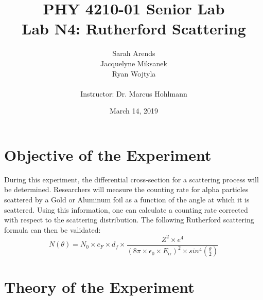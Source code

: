 \documentclass[a4paper]{article}
\title{PHY 4210-01 Senior Lab \\Lab N4: Rutherford Scattering}
\author{Sarah Arends \\ 
        Jacquelyne Miksanek \\
        Ryan Wojtyla \\ \\
        Instructor: Dr. Marcus Hohlmann}
\date{March 14, 2019}
\begin{document}
\maketitle 

\begin{abstract}
  \qq 
\end{abstract}

\newpage

\tableofcontents

\newpage

\section{Objective of the Experiment}
\qq During this experiment, the differential cross-section for a scattering
process will be determined. Researchers will measure the counting rate for alpha
particles scattered by a Gold or Aluminum foil as a function of the angle at
which it is scattered. Using this information, one can calculate a counting rate
corrected with respect to the scattering distribution. The following Rutherford
scattering formula can then be validated:
\begin{equation}
N(\theta) = N_0 \times c_F \times d_f \times 
            \frac {Z^2 \times e^4}
                  {
                  \left( 8\pi \times \epsilon_0\times E_{\alpha} \right) ^2 
                   \times  sin^4 \left( \frac{\theta}{2} \right)
                  }      
\end{equation}

\section{Theory of the Experiment}
\end{document}
